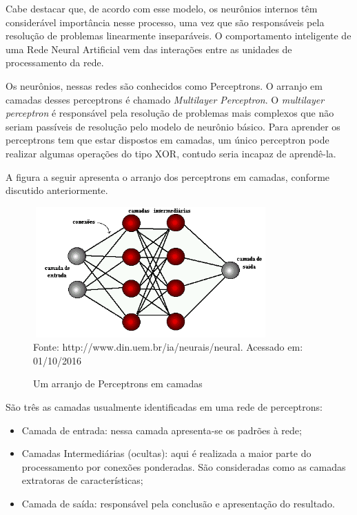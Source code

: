 Cabe destacar que, de acordo com esse modelo, os neurônios internos têm considerável importância nesse processo, uma vez que são responsáveis pela resolução de problemas linearmente inseparáveis. 
O comportamento inteligente de uma Rede Neural Artificial vem das interações entre as unidades de processamento da rede.

Os neurônios, nessas redes são conhecidos como Perceptrons. O arranjo em camadas desses perceptrons é chamado \textit{Multilayer Perceptron}.
O \textit{multilayer perceptron} é responsável pela resolução de problemas mais complexos que não seriam passíveis de resolução pelo modelo 
de neurônio básico. Para aprender os perceptrons tem que estar dispostos em camadas, um único perceptron pode realizar algumas operações do 
tipo XOR, contudo seria incapaz de aprendê-la.


A figura a seguir apresenta o arranjo dos perceptrons em camadas, conforme discutido anteriormente.


\begin{figure}[!ht]
\centering
\caption{Um arranjo de Perceptrons em camadas}
\vspace{1mm}
\includegraphics[width=90mm, height=50mm]{Figuras/Neural/camdasIntermediarias.png}\\
\tiny Fonte: http://www.din.uem.br/ia/neurais/neural. Acessado em: 01/10/2016
\end{figure}

São três as camadas usualmente identificadas em uma rede de perceptrons:
\begin{itemize}
 \item Camada de entrada: nessa camada apresenta-se os padrões à rede;
 \item Camadas Intermediárias (ocultas): aqui é realizada a maior parte do processamento por conexões ponderadas. São consideradas como as camadas 
 extratoras de características;
 \item Camada de saída: responsável pela conclusão e apresentação do resultado.
\end{itemize}

